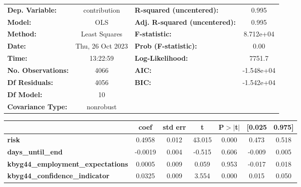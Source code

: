 \begin{center}
\begin{tabular}{lclc}
\toprule
\textbf{Dep. Variable:}                   &   contribution   & \textbf{  R-squared (uncentered):}      &     0.995   \\
\textbf{Model:}                           &       OLS        & \textbf{  Adj. R-squared (uncentered):} &     0.995   \\
\textbf{Method:}                          &  Least Squares   & \textbf{  F-statistic:       }          & 8.712e+04   \\
\textbf{Date:}                            & Thu, 26 Oct 2023 & \textbf{  Prob (F-statistic):}          &     0.00    \\
\textbf{Time:}                            &     13:22:59     & \textbf{  Log-Likelihood:    }          &    7751.7   \\
\textbf{No. Observations:}                &        4066      & \textbf{  AIC:               }          & -1.548e+04  \\
\textbf{Df Residuals:}                    &        4056      & \textbf{  BIC:               }          & -1.542e+04  \\
\textbf{Df Model:}                        &          10      & \textbf{                     }          &             \\
\textbf{Covariance Type:}                 &    nonrobust     & \textbf{                     }          &             \\
\bottomrule
\end{tabular}
\begin{tabular}{lcccccc}
                                          & \textbf{coef} & \textbf{std err} & \textbf{t} & \textbf{P$> |$t$|$} & \textbf{[0.025} & \textbf{0.975]}  \\
\midrule
\textbf{risk}                             &       0.4958  &        0.012     &    43.015  &         0.000        &        0.473    &        0.518     \\
\textbf{days\_until\_end}                 &      -0.0019  &        0.004     &    -0.515  &         0.606        &       -0.009    &        0.005     \\
\textbf{kbyg44\_employment\_expectations} &       0.0005  &        0.009     &     0.059  &         0.953        &       -0.017    &        0.018     \\
\textbf{kbyg44\_confidence\_indicator}    &       0.0325  &        0.009     &     3.554  &         0.000        &        0.015    &        0.050     \\

\end{tabular}
\end{center}
